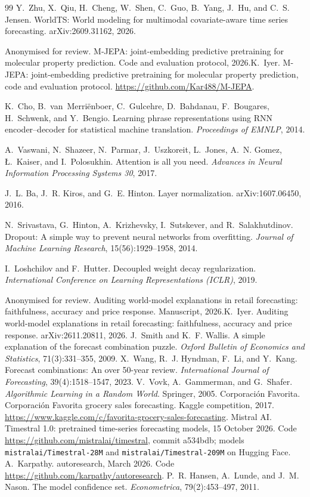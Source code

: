 \begin{thebibliography}{99}
 Y.~Zhu, X.~Qiu, H.~Cheng, W.~Shen, C.~Guo, B.~Yang, J.~Hu, and C.~S. Jensen. WorldTS: World modeling for multimodal covariate-aware time series forecasting. arXiv:2609.31162, 2026.

 \ifanon Anonymised for review. M-JEPA: joint-embedding predictive pretraining for molecular property prediction. Code and evaluation protocol, 2026.\else K.~Iyer. M-JEPA: joint-embedding predictive pretraining for molecular property prediction, code and evaluation protocol. \url{https://github.com/Kar488/M-JEPA}.\fi

 K.~Cho, B.~van~Merri\"enboer, C.~Gulcehre, D.~Bahdanau, F.~Bougares, H.~Schwenk, and Y.~Bengio. Learning phrase representations using RNN encoder--decoder for statistical machine translation. \emph{Proceedings of EMNLP}, 2014.

 A.~Vaswani, N.~Shazeer, N.~Parmar, J.~Uszkoreit, L.~Jones, A.~N. Gomez, {\L}.~Kaiser, and I.~Polosukhin. Attention is all you need. \emph{Advances in Neural Information Processing Systems 30}, 2017.

 J.~L. Ba, J.~R. Kiros, and G.~E. Hinton. Layer normalization. arXiv:1607.06450, 2016.

 N.~Srivastava, G.~Hinton, A.~Krizhevsky, I.~Sutskever, and R.~Salakhutdinov. Dropout: A simple way to prevent neural networks from overfitting. \emph{Journal of Machine Learning Research}, 15(56):1929--1958, 2014.

 I.~Loshchilov and F.~Hutter. Decoupled weight decay regularization. \emph{International Conference on Learning Representations (ICLR)}, 2019.

 \ifanon Anonymised for review. Auditing world-model explanations in retail forecasting: faithfulness, accuracy and price response. Manuscript, 2026.\else K.~Iyer. Auditing world-model explanations in retail forecasting: faithfulness, accuracy and price response. arXiv:2611.20811, 2026.\fi
{} J.~Smith and K.~F. Wallis. A simple explanation of the forecast combination puzzle. \emph{Oxford Bulletin of Economics and Statistics}, 71(3):331--355, 2009.
 X.~Wang, R.~J. Hyndman, F.~Li, and Y.~Kang. Forecast combinations: An over 50-year review. \emph{International Journal of Forecasting}, 39(4):1518--1547, 2023.
 V.~Vovk, A.~Gammerman, and G.~Shafer. \emph{Algorithmic Learning in a Random World}. Springer, 2005.
 Corporaci\'on Favorita. Corporaci\'on Favorita grocery sales forecasting. Kaggle competition, 2017. \url{https://www.kaggle.com/c/favorita-grocery-sales-forecasting}.
 Mistral AI. Timestral 1.0: pretrained time-series forecasting models, 15 October 2026. Code \url{https://github.com/mistralai/timestral}, commit a534bdb; models \texttt{mistralai/Timestral-28M} and \texttt{mistralai/Timestral-209M} on Hugging Face.
 A.~Karpathy. autoresearch, March 2026. Code \url{https://github.com/karpathy/autoresearch}.
 P.~R. Hansen, A.~Lunde, and J.~M. Nason. The model confidence set. \emph{Econometrica}, 79(2):453--497, 2011.
\end{thebibliography}
